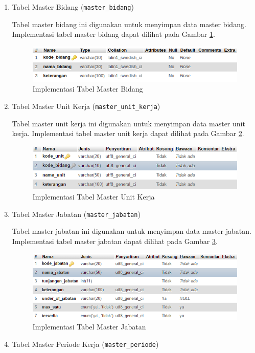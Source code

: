 	    \begin{enumerate}
	        \itemsep0em
	        \item Tabel Master Bidang (\texttt{master\_bidang})
	        
	        Tabel master bidang ini digunakan untuk menyimpan data master bidang. Implementasi tabel master bidang dapat dilihat pada Gambar \ref{imp_tabel_bidang}.
	        \begin{figure}[H]
                \centering
                \includegraphics[width=12cm]{gambar/database/master_bidang}
                \caption{Implementasi Tabel Master Bidang}
                \label{imp_tabel_bidang}
            \end{figure}
	        \item Tabel Master Unit Kerja (\texttt{master\_unit\_kerja})
	        
	        Tabel master unit kerja ini digunakan untuk menyimpan data master unit kerja. Implementasi tabel master unit kerja dapat dilihat pada Gambar \ref{imp_tabel_unitkerja}.
	        \begin{figure}[H]
                \centering
                \includegraphics[width=12cm]{gambar/database/master_unit_kerja}
                \caption{Implementasi Tabel Master Unit Kerja}
                \label{imp_tabel_unitkerja}
            \end{figure}
	        \item Tabel Master Jabatan (\texttt{master\_jabatan})
	        
	        Tabel master jabatan ini digunakan untuk menyimpan data master jabatan. Implementasi tabel master jabatan dapat dilihat pada Gambar \ref{imp_tabel_jabatan}.
	        \begin{figure}[H]
                \centering
                \includegraphics[width=12cm]{gambar/database/master_jabatan}
                \caption{Implementasi Tabel Master Jabatan}
                \label{imp_tabel_jabatan}
            \end{figure}
	        \item Tabel Master Periode Kerja (\texttt{master\_periode})
	        

\end{enumerate}
